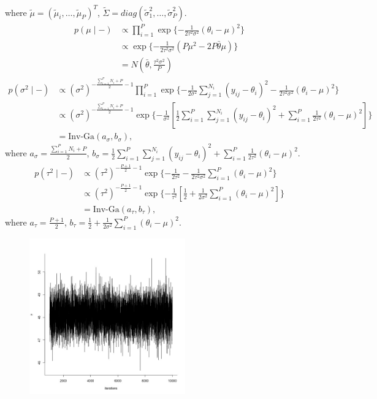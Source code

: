 \documentclass[11pt]{article}
\newcommand{\half}{\frac{1}{2}}
\begin{document}
\begin{enumerate}[(A)]
where $\tilde{\mu} = (\tilde{\mu}_i, \dots, \tilde{\mu}_P)^T$, $\tilde{\Sigma} = diag(\tilde{\sigma}_1^2, \dots, \tilde{\sigma}_P^2)$.
\begin{align*}
    p(\mu \mid -) &\propto \prod_{i=1}^P \exp\{-\frac{1}{2\tau^2 \sigma^2} (\theta_i - \mu)^2\} \\
    &\propto \exp\{-\frac{1}{2\tau^2 \sigma^2} (P \mu^2 - 2P \bar{\theta} \mu) \} \\
    &= N(\bar{\theta}, \frac{\tau^2 \sigma^2}{P} )
\end{align*}
\begin{align*}
    p(\sigma^2 \mid -) &\propto (\sigma^2)^{-\frac{\sum_{i=1}^P N_i + P}{2} - 1} \prod_{i=1}^P \exp\{ -\frac{1}{2\sigma^2} \sum_{j=1}^{N_i} (y_{ij} - \theta_i)^2 - \frac{1}{2\tau^2 \sigma^2} (\theta_i -\mu)^2 \} \\
    &\propto (\sigma^2)^{-\frac{\sum_{i=1}^P N_i + P}{2} - 1} \exp\{ -\frac{1}{\sigma^2} [\half \sum_{i=1}^P \sum_{j=1}^{N_i} (y_{ij} - \theta_i)^2 + \sum_{i=1}^P \frac{1}{2\tau^2} (\theta_i -\mu)^2] \} \\
    &= \text{Inv-Ga}(a_\sigma, b_\sigma),
\end{align*}
where $a_\sigma = \frac{\sum_{i=1}^P N_i + P}{2}$, $b_\sigma = \half \sum_{i=1}^P \sum_{j=1}^{N_i} (y_{ij} - \theta_i)^2 + \sum_{i=1}^P \frac{1}{2\tau^2} (\theta_i -\mu)^2$.
\begin{align*}
    p(\tau^2 \mid -) &\propto (\tau^2)^{-\frac{P+1}{2} - 1} \exp\{ -\frac{1}{2\tau^2} - \frac{1}{2\tau^2 \sigma^2} \sum_{i=1}^P (\theta_i -\mu)^2\} \\
    &\propto (\tau^2)^{-\frac{P+1}{2} - 1} \exp\{ -\frac{1}{\tau^2} [\half + \frac{1}{2 \sigma^2} \sum_{i=1}^P (\theta_i -\mu)^2] \} \\
    &= \text{Inv-Ga} (a_\tau, b_\tau),
\end{align*}
where $a_\tau = \frac{P+1}{2}$, $b_\tau = \half + \frac{1}{2 \sigma^2} \sum_{i=1}^P (\theta_i -\mu)^2$.
\begin{figure}[h]
    \centering
    \includegraphics[width=0.6\textwidth]{Ex4/figures/mu_tra.jpeg}

\end{figure}
\end{enumerate}
\end{document}
